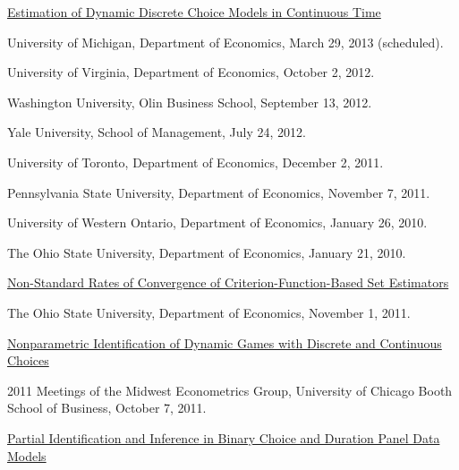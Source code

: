 \documentclass[10pt,letterpaper]{article}
\renewenvironment{itemize}{
  \begin{list}{}{
    \setlength{\leftmargin}{1.5em}
    \setlength{\itemsep}{0.25em}
    \setlength{\parskip}{0pt}
    \setlength{\parsep}{0.25em}
  }
}{
  \end{list}
}
\begin{document}
\begin{itemize}

\item \href{http://jblevins.org/research/abbe}{Estimation of Dynamic Discrete Choice Models in Continuous Time}

  \begin{itemize}
  \item University of Michigan, Department of Economics,
    March 29, 2013 (scheduled).
  \item University of Virginia, Department of Economics,
    October 2, 2012.
  \item Washington University, Olin Business School,
    September 13, 2012.
  \item Yale University, School of Management,
    July 24, 2012.
  \item University of Toronto, Department of Economics,
    December 2, 2011.
  \item Pennsylvania State University, Department of Economics,
    November 7, 2011.
  \item University of Western Ontario, Department of Economics,
    January 26, 2010.
  \item The Ohio State University, Department of Economics,
    January 21, 2010.
  \end{itemize}

\item \href{http://jblevins.org/research/cuberoot}{Non-Standard Rates of Convergence of Criterion-Function-Based Set Estimators}

  \begin{itemize}
  \item The Ohio State University, Department of Economics,
    November 1, 2011.
  \end{itemize}

\item \href{http://jblevins.org/research/dcident}{Nonparametric Identification of Dynamic Games with Discrete and Continuous Choices}

  \begin{itemize}
    \item 2011 Meetings of the Midwest Econometrics Group,
      University of Chicago Booth School of Business,
      October 7, 2011.
  \end{itemize}

\item \href{http://jblevins.org/research/panel}{Partial Identification and Inference in Binary Choice and Duration
    Panel Data Models}


\end{itemize}
\end{document}
